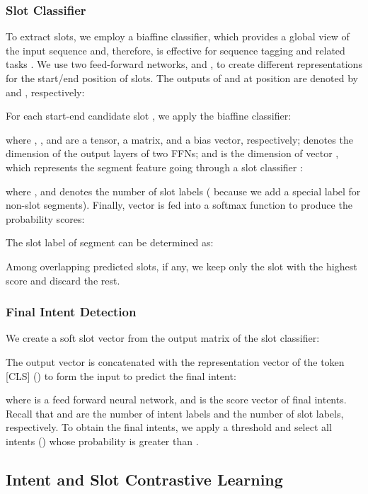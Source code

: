 \documentclass{ecai}
\begin{document}
\subsubsection{Slot Classifier}
To extract slots, we employ a biaffine classifier, which provides a global view of the input sequence and, therefore, is effective for sequence tagging and related tasks \cite{Li:2019}. We use two feed-forward networks,  and , to create different representations for the start/end position of slots. The outputs of  and  at position  are denoted by   and , respectively:



For each start-end candidate slot  , we apply the biaffine classifier:

where , , and  are a  tensor, a  matrix, and a bias vector, respectively;  denotes the dimension of the output layers of two FFNs; and  is the dimension of vector , which represents the segment feature going through a slot classifier :


where , and  denotes the number of slot labels ( because we add a special label for non-slot
segments). Finally, vector  is fed into a softmax function to produce the probability scores:

The slot label of segment  can be determined as:

Among overlapping predicted slots, if any, we keep only the slot with the highest score and discard the rest.

\subsubsection{Final Intent Detection}
We create a soft slot vector from the output matrix of the slot classifier: 

The output vector  is concatenated with the representation vector of the token [CLS] () to form the input  to predict the final intent: 


where  is a feed forward neural network, and  is the score vector of final intents. Recall that  and  are the number of intent labels and the number of slot labels, respectively. To obtain the final intents, we apply a threshold  and select all intents  () whose probability is greater than .

\subsection{Intent and Slot Contrastive Learning }
\end{document}
